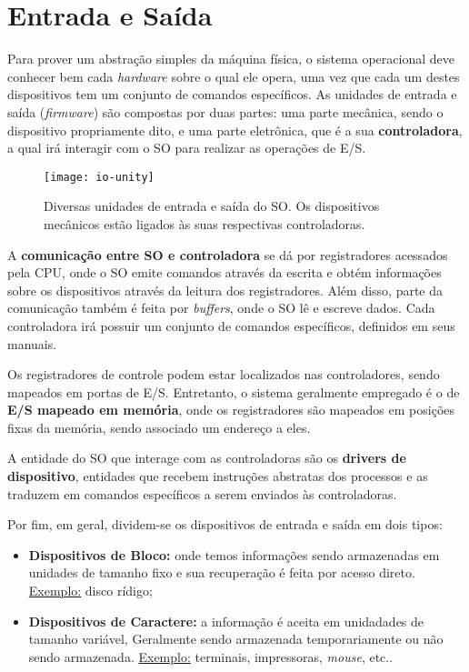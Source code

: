 \chapter{Entrada e Saída}

Para prover um abstração simples da máquina física, o sistema operacional deve conhecer bem cada \textit{hardware} sobre o qual ele opera, uma vez que cada um destes dispositivos tem um conjunto de comandos específicos. As unidades de entrada e saída (\textit{firmware}) são compostas por duas partes: uma parte mecânica, sendo o dispositivo propriamente dito, e uma parte eletrônica, que é a sua \textbf{controladora}, a qual irá interagir com o SO para realizar as operações de E/S.

\begin{figure}[H]
  \centering
  \texttt{[image: io-unity]}
  \caption{Diversas unidades de entrada e saída do SO. Os dispositivos mecânicos estão ligados às suas respectivas controladoras.}
  \label{fig:io-unity}
\end{figure}

A \textbf{comunicação entre SO e controladora} se dá por registradores acessados pela CPU, onde o SO emite comandos através da escrita e obtém informações sobre os dispositivos através da leitura dos registradores. Além disso, parte da comunicação também é feita por \textit{buffers}, onde o SO lê e escreve dados. Cada controladora irá possuir um conjunto de comandos específicos, definidos em seus manuais.

Os registradores de controle podem estar localizados nas controladores, sendo mapeados em portas de E/S. Entretanto, o sistema geralmente empregado é o de \textbf{E/S mapeado em memória}, onde os registradores são mapeados em posições fixas da memória, sendo associado um endereço a eles.

A entidade do SO que interage com as controladoras são os \textbf{drivers de dispositivo}, entidades que recebem instruções abstratas dos processos e as traduzem em comandos específicos a serem enviados às controladoras.

Por fim, em geral, dividem-se os dispositivos de entrada e saída em dois tipos:
\begin{itemize}
  \item \textbf{Dispositivos de Bloco:} onde temos informações sendo armazenadas em unidades de tamanho fixo e sua recuperação é feita por acesso direto. \underline{Exemplo:} disco rídigo;

  \item \textbf{Dispositivos de Caractere:} a informação é aceita em unidadades de tamanho variável, Geralmente sendo armazenada temporariamente ou não sendo armazenada. \underline{Exemplo:} terminais, impressoras, \textit{mouse}, etc..
\end{itemize}





